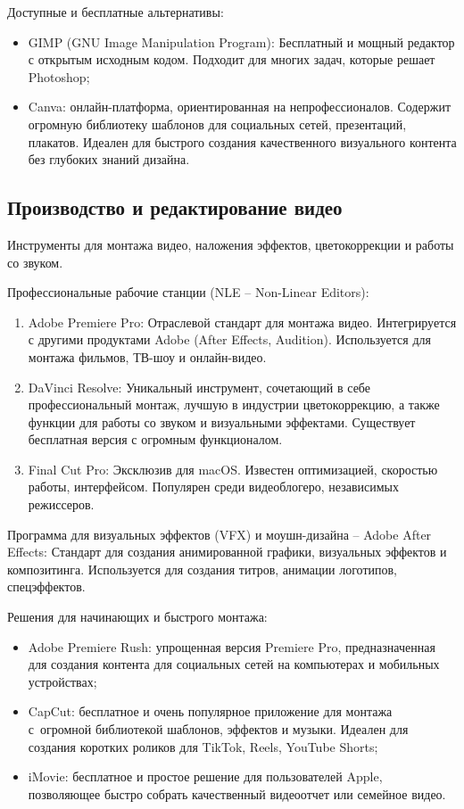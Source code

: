\documentclass{ou}
\begin{document}
Доступные и бесплатные альтернативы:
\begin{itemize}[label=-, leftmargin=0em, itemindent=3.35em, nosep]
\item GIMP (GNU Image Manipulation Program): Бесплатный и мощный редактор с открытым исходным кодом. Подходит для многих задач, которые решает Photoshop;
\item Canva: онлайн-платформа, ориентированная на непрофессионалов. Содержит огромную библиотеку шаблонов для социальных сетей, презентаций, плакатов. Идеален для быстрого создания качественного визуального контента без глубоких знаний дизайна.
\end{itemize}
\subsection{Производство и редактирование видео}
Инструменты для монтажа видео, наложения эффектов, цветокоррекции и работы со звуком.

Профессиональные рабочие станции (NLE -- Non-Linear Editors):
\begin{enumerate}[leftmargin=0em, itemindent=3.75em, nosep, label=\arabic*)]
\item Adobe Premiere Pro: Отраслевой стандарт для монтажа видео. Интегрируется с другими продуктами Adobe (After Effects, Audition). Используется для монтажа фильмов, ТВ-шоу и онлайн-видео.
\item DaVinci Resolve: Уникальный инструмент, сочетающий в себе профессиональный монтаж, лучшую в индустрии цветокоррекцию, а также функции для работы со звуком и визуальными эффектами. Существует бесплатная версия с огромным функционалом.
\item Final Cut Pro: Эксклюзив для macOS. Известен оптимизацией, скоростью работы, интерфейсом. Популярен среди видеоблогеро, независимых режиссеров.
\end{enumerate}

Программа для визуальных эффектов (VFX) и моушн-дизайна -- Adobe After Effects: Стандарт для создания анимированной графики, визуальных эффектов и композитинга. Используется для создания титров, анимации логотипов, спецэффектов.

Решения для начинающих и быстрого монтажа:
\begin{itemize}[label=-, leftmargin=0em, itemindent=3.35em, nosep]
\item Adobe Premiere Rush: упрощенная версия Premiere Pro, предназначенная для создания контента для социальных сетей на компьютерах и мобильных устройствах;
\item CapCut: бесплатное и очень популярное приложение для монтажа с~огромной библиотекой шаблонов, эффектов и музыки. Идеален для создания коротких роликов для TikTok, Reels, YouTube Shorts;
\item iMovie: бесплатное и простое решение для пользователей Apple, позволяющее быстро собрать качественный видеоотчет или семейное видео.
\end{itemize}
\end{document}
